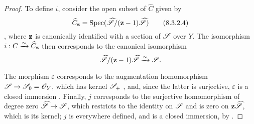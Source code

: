 \begin{proof}
To define $i$, consider the open subset of $\widehat{C}$ given by
\[
\label{II.8.3.2.4}
  \widehat{C}_{\mathbf{z}} = \operatorname{Spec}(\widehat{\mathscr{S}}/(\mathbf{z}-1)\widehat{\mathscr{S}})
\tag{8.3.2.4}
\]
, where $\mathbf{z}$ is canonically identified with a section of $\mathscr{S}$ over $Y$.
The isomorphism $i: C\xrightarrow{\sim}\widehat{C}_{\mathbf{z}}$ then corresponds to the canonical isomorphism 
\[
  \widehat{\mathscr{S}}/(\mathbf{z}-1)\widehat{\mathscr{S}} \xrightarrow{\sim} \mathscr{S}.
\]

The morphism $\varepsilon$ corresponds to the augmentation homomorphism $\sh{S}\to\sh{S}_0=\sh{O}_Y$, which has kernel $\mathscr{S}_+$ , and, since the latter is surjective, $\varepsilon$ is a closed immersion .
Finally, $j$ corresponds  to the surjective homomorphism of degree zero $\widehat{\sh{S}}\to\sh{S}$, which restricts to the identity on $\mathscr{S}$ and is zero on $\mathbf{z}\widehat{\mathscr{S}}$, which is its kernel;
$j$ is everywhere defined, and is a closed immersion, by .


\end{proof}
